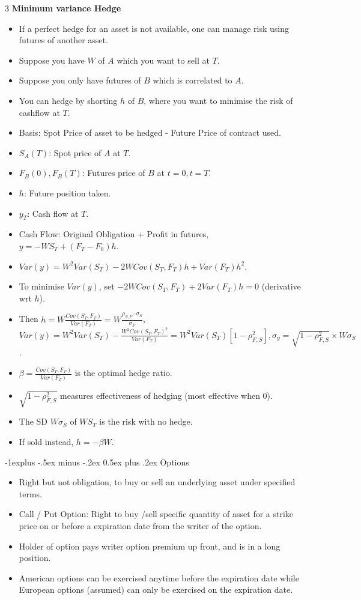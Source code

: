 \documentclass[10pt, landscape]{article}
\makeatletter
\renewcommand{\section}{\@startsection{section}{1}{0mm}%
                                {-1ex plus -.5ex minus -.2ex}%
                                {0.5ex plus .2ex}%
                                {\normalfont\large\bfseries}}
\renewcommand{\section}{\@startsection{section}{2}{0mm}%
                                {-1explus -.5ex minus -.2ex}%
                                {0.5ex plus .2ex}%
                                {\normalfont\normalsize\bfseries}}
\makeatother
\begin{document}
\begin{multicols*}{3}
\textbf{Minimum variance Hedge}
\begin{itemize}
    \item If a perfect hedge for an asset is not available, one can manage risk using futures of another asset.
    \item Suppose you have $W$ of $A$ which you want to sell at $T$.
    \item Suppose you only have futures of $B$ which is correlated to $A$.
    \item You can hedge by shorting $h$ of $B$, where you want to minimise the risk of cashflow at $T$.
    \item Basis: Spot Price of asset to be hedged - Future Price of contract used.
    \item $S_A(T)$: Spot price of $A$ at $T$.
    \item $F_B(0), F_B(T)$: Futures price of $B$ at $t=0, t=T$.
    \item $h$: Future position taken.
    \item $y_T$: Cash flow at $T$.
    \item Cash Flow: Original Obligation + Profit in futures, $y=-WS_T+(F_T-F_0)h$.
    \item $Var(y)=W^2Var(S_T)-2WCov(S_T, F_T)h+Var(F_T)h^2$.
    \item To minimise $Var(y)$, set $-2WCov(S_T, F_T)+2Var(F_T)h=0$ (derivative wrt $h$).
    \item Then $h=W\frac{Cov(S_T, F_T)}{Var(F_T)}=W\frac{\rho_{S,F}\cdot \sigma_S}{\sigma_F}$, $Var(y)=W^2Var(S_T)-\frac{W^2Cov(S_T,F_T)^2}{Var(F_T)}=W^2Var(S_T)[1-\rho_{F,S}^2], \sigma_y=\sqrt{1-\rho_{F,S}^2}\times W \sigma_S$.
    \item $\beta=\frac{Cov(S_T,F_T)}{Var(F_T)}$ is the optimal hedge ratio.
    \item $\sqrt{1-\rho_{F,S}^2}$ measures effectiveness of hedging (most effective when 0).
    \item The SD $W\sigma_S$ of $WS_T$ is the risk with no hedge.
    \item If sold instead, $h=-\beta W$.
\end{itemize}

\section{Options}
\begin{itemize}
    \item Right but not obligation, to buy or sell an underlying asset under specified terms.
    \item Call / Put Option: Right to buy /sell specific quantity of asset for a strike price on or before a expiration date from the writer of the option.
    \item Holder of option pays writer option premium up front, and is in a long position.
    \item American options can be exercised anytime before the expiration date while European options (assumed) can only be exercised on the expiration date.
\end{itemize}


\end{multicols*}
\end{document}
